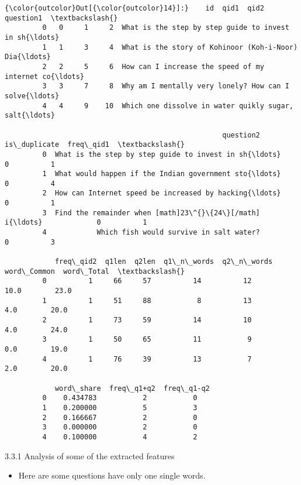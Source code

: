 \documentclass[11pt]{article}
\providecommand{\tightlist}{%
      \setlength{\itemsep}{0pt}\setlength{\parskip}{0pt}}
\begin{document}
\begin{Verbatim}[commandchars=\\\{\}]
{\color{outcolor}Out[{\color{outcolor}14}]:}    id  qid1  qid2                                          question1  \textbackslash{}
         0   0     1     2  What is the step by step guide to invest in sh{\ldots}   
         1   1     3     4  What is the story of Kohinoor (Koh-i-Noor) Dia{\ldots}   
         2   2     5     6  How can I increase the speed of my internet co{\ldots}   
         3   3     7     8  Why am I mentally very lonely? How can I solve{\ldots}   
         4   4     9    10  Which one dissolve in water quikly sugar, salt{\ldots}   
         
                                                    question2  is\_duplicate  freq\_qid1  \textbackslash{}
         0  What is the step by step guide to invest in sh{\ldots}             0          1   
         1  What would happen if the Indian government sto{\ldots}             0          4   
         2  How can Internet speed be increased by hacking{\ldots}             0          1   
         3  Find the remainder when [math]23\^{}\{24\}[/math] i{\ldots}             0          1   
         4            Which fish would survive in salt water?             0          3   
         
            freq\_qid2  q1len  q2len  q1\_n\_words  q2\_n\_words  word\_Common  word\_Total  \textbackslash{}
         0          1     66     57          14          12         10.0        23.0   
         1          1     51     88           8          13          4.0        20.0   
         2          1     73     59          14          10          4.0        24.0   
         3          1     50     65          11           9          0.0        19.0   
         4          1     76     39          13           7          2.0        20.0   
         
            word\_share  freq\_q1+q2  freq\_q1-q2  
         0    0.434783           2           0  
         1    0.200000           5           3  
         2    0.166667           2           0  
         3    0.000000           2           0  
         4    0.100000           4           2  
\end{Verbatim}
            
    3.3.1 Analysis of some of the extracted features

    \begin{itemize}
\tightlist
\item
  Here are some questions have only one single words.
\end{itemize}
\end{document}
